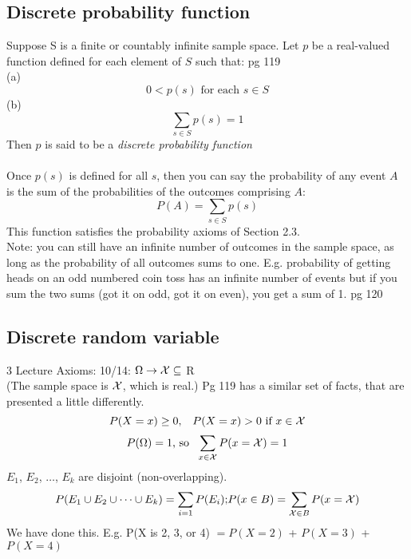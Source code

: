 \subsection{Discrete probability function}
Suppose S is a finite or countably infinite sample space.  Let $p$ be a real-valued function defined for each element of $S$ such that: {\tiny pg 119} \hfill \\
(a)  \[ 0 < p(s) \mbox{ for each \ } s \in S  \] 
(b)  \[  \sum\limits_{s \in S} p(s) = 1 \]
Then $p$ is said to be a \textit{discrete probability function} \hfill \\
\hfill \\
Once $p(s)$ is defined for all $s$, then you can say the probability of any event $A$ is the sum of the probabilities of the outcomes comprising $A$: 
\[  P(A) = \sum\limits_{s \in S} p(s) \]
This function satisfies the probability axioms of Section 2.3.   \hfill \\

Note: you can still have an infinite number of outcomes in the sample space, as long as the probability of all outcomes sums to one.  E.g. probability of getting heads on an odd numbered coin toss has an infinite number of events but if you sum the two sums (got it on odd, got it on even), you get a sum of 1.  {\tiny pg 120}

\subsection{Discrete random variable}
3 Lecture Axioms: {\tiny 10/14}:   $\Omega \rightarrow {\cal X} \subseteq $ R   \hfill \\  
(The sample space is ${\cal X}$, which is real.)  Pg 119 has a similar set of facts, that are presented a little differently. 
 \hfill \\  
	\[  P(X=x) \geq 0 \mbox{, \ \  }  P(X=x) > 0  \mbox{ if } x \in {\cal X}  \]
	\[  P(\Omega) = 1 \mbox{, so \ }  \sum\limits_{x \in \cal X} P(x= {\cal X}) = 1\]
$E_1$, $E_2$, $\dots$, $E_k$ are disjoint (non-overlapping). 
	\[ P(E_1 \cup E_2 \cup \dots \cup E_k) =  \sum\limits_{i=1} P(E_i) \mbox{;} P(x \in B) = \sum\limits_{{\cal X} \in B} P(x = {\cal X}) \]
We have done this.  E.g. P(X is 2, 3, or 4) $= P(X=2)$ + $P(X=3)$ + $P(X=4)$
	

